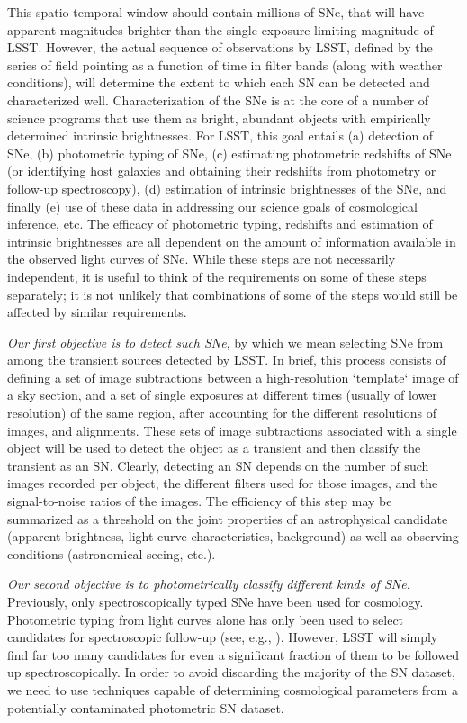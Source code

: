 This spatio-temporal window should contain millions  of SNe, that will have apparent magnitudes brighter than the single
exposure limiting magnitude of LSST.  However, the actual sequence of
observations by LSST, defined by the series of field pointing as a
function of time in filter bands (along with weather conditions), will
determine the extent to which each SN can be detected and characterized
well.  Characterization of the SNe is at the core of a number of science
programs that use them as bright, abundant objects with empirically
determined intrinsic brightnesses. For LSST, this goal entails (a)
detection of SNe, (b) photometric typing of SNe, (c) estimating photometric
redshifts of SNe (or identifying host galaxies and obtaining their
redshifts from photometry or follow-up spectroscopy), (d) estimation of
intrinsic brightnesses of the SNe, and finally (e) use of these data in
addressing our science goals of cosmological inference, etc. The efficacy
of photometric typing, redshifts and estimation of intrinsic brightnesses
are all dependent on the amount of information available in the observed
light curves of SNe. While these steps are not necessarily independent, it
is useful to think of the requirements on some of these steps separately;
it is not unlikely  that combinations of some of the steps would still be
affected by similar requirements. 

{\emph{Our first objective is to detect such SNe}}, by which we mean
selecting SNe from among the transient sources detected by LSST.
In brief, this process consists of defining a set of image subtractions
between a high-resolution `template` image of a sky section, and a set of
single exposures at different times (usually of lower resolution) of the
same region, after accounting for the different resolutions of images, and
alignments. These sets of image subtractions associated with a single
object will be used to detect the object as a transient and then classify
the transient as an SN. Clearly, detecting an SN depends on the number of
such images recorded per object, the different filters used for those
images, and the signal-to-noise ratios of the images. %
The efficiency of this step may be summarized as a threshold on the
joint properties of an astrophysical candidate (apparent brightness, light
curve characteristics, background) as well as observing conditions
(astronomical seeing, etc.).  

{\emph{Our second objective is to photometrically classify different kinds of SNe.}} 
Previously, only spectroscopically typed SNe have been used for cosmology. Photometric 
typing from light curves alone has only been used to select candidates for spectroscopic 
follow-up (see, e.g., \citet{Sako2008}). However, LSST will simply find far too many 
candidates for even a significant fraction of them to be followed up spectroscopically. In order to avoid 
discarding the majority of the SN dataset, we need to use techniques capable of 
determining cosmological parameters from a potentially contaminated photometric SN dataset.

